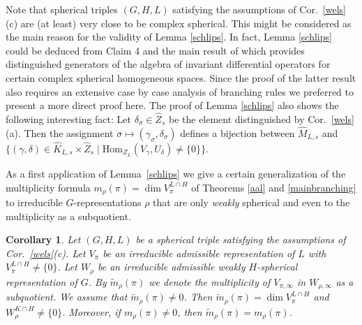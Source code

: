 \documentclass[10]{amsart}
\newtheorem{cor}[thm]{Corollary}
\theoremstyle{remark}
\theoremstyle{definition}
\numberwithin{equation}{section}
\newcommand{\Hom}{\mathrm{Hom}}
\begin{document}
{Note that spherical triples $(G,H,L)$ satisfying the assumptions of Cor.~\ref{wels}(c) are (at least) very close to be complex spherical. This might be considered as the main reason for the validity of Lemma \ref{schlips}. In fact, Lemma \ref{schlips} could be deduced from Claim 4 and the main result of \cite{KK19} which provides distinguished generators of the
algebra of invariant differential operators for certain complex spherical homogeneous spaces. Since the proof of the latter result also requires an extensive case by case analysis of branching rules we preferred to present a more direct proof here. The proof of Lemma \ref{schlips} also shows the following interesting fact: Let $\delta_\sigma\in\widehat Z_s$ be
the element distinguished by Cor.~\ref{wels}(a). Then the assignment $\sigma \mapsto (\gamma_\sigma,\delta_\sigma)$ defines a bijection between $\widehat M_{L,s}$ and
$\{(\gamma,\delta)\in \widehat K_{L,s}\times \widehat Z_s\mid \Hom_{Z_L}(V_\gamma,U_\delta)\ne\{0\}\}$.

As a first application of Lemma~\ref{schlips} we give a certain generalization of the multiplicity formula $m_\rho(\pi)=\dim V_\pi^{L\cap H}$ of Theorems \ref{aal} and \ref{mainbranching} to irreducible $G$-representations $\rho$
that are only {\em weakly} spherical and even to the multiplicity as a subquotient.

\begin{cor}\label{fliege} Let $(G,H,L)$ be a spherical triple satisfying the assumptions of Cor.~\ref{wels}(c).  Let $V_\pi$ be an irreducible admissible representation of $L$ with $V_\pi^{L\cap H}\ne\{0\}$. Let $W_\rho$ be an irreducible admissible weakly $H$-spherical representation of $G$. By $\widetilde m_\rho(\pi)$ we denote the multiplicity of $V_{\pi,\infty}$ in $W_{\rho,\infty}$
as a subquotient. We assume that $\widetilde m_\rho(\pi)\ne 0$. Then $\widetilde m_\rho(\pi)=\dim V_\pi^{L\cap H}$ and $W_\rho^{K\cap H}\ne\{0\}$. Moreover, if $m_\rho(\pi)\ne 0$, then $\widetilde m_\rho(\pi)=m_\rho(\pi)$.
\end{cor}

}
\end{document}
